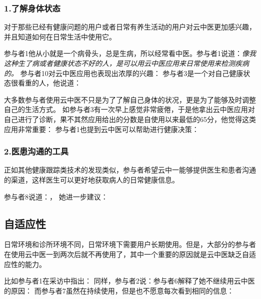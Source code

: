 \subsubsection{1.了解身体状态}

对于那些已经有健康问题的用户或者日常有养生活动的用户对云中医更加感兴趣，并且知道如何在日常生活中使用它。

参与者1他从小就是一个病骨头，总是生病，所以经常看中医。参与者1说道：\emph{像我这种生了病或者健康状态不好的人，是可以用云中医应用来日常使用来检测疾病的。}
参与者10对云中医应用也表现出浓厚的兴趣：
参与者3是一个对自己健康状态很看重的人，他说道：

大多数参与者使用云中医不只是为了了解自己身体的状况，更是为了能够及时调整自己的生活方式。
如参与者3有一次早上感觉非常疲倦，于是他拿出云中医应用对自己进行了诊断，果不其然应用给出的分数是自使用以来最低的65分，他觉得这类应用非常重要：
参与者1也提到云中医可以帮助进行健康决策：


\subsubsection{2.医患沟通的工具}

正如其他健康跟踪类技术的发现类似，参与者希望云中一能够提供医生和患者沟通的渠道，这样医生可以更好地获取病人的日常健康信息。

参与者8说道：， 她进一步建议：

\subsection{自适应性}
日常环境和诊所环境不同，日常环境下需要用户长期使用。但是，大部分的参与者在使用云中医一到两次后就不再使用了，其中一个重要的原因就是云中医缺乏自适应性的能力。

比如参与者1在采访中指出：
同样，参与者2说：参与者6解释了她不继续用云中医的原因：
而参与者7虽然在持续使用，但是也不愿意每次看到相同的信息：

